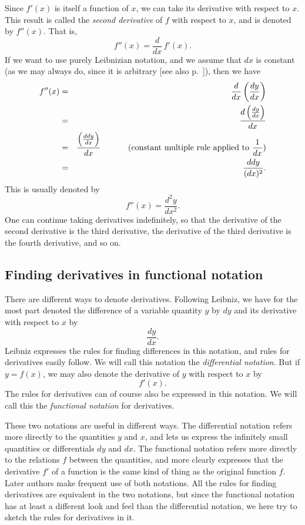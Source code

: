 \documentclass[twoside,openright]{article}
\begin{document}
Since $f'(x)$ is itself a function of $x$, we can take its derivative
with respect to $x$.  This result is called the {\em second
  derivative} of $f$ with respect to $x$, and is denoted by $f''(x).$
That is,
$$f''(x) =  \frac{d}{dx}\,f'(x).$$
If we want to use purely Leibnizian notation, and we assume that $dx$
is constant (as we may always do, since it is arbitrary [see also p.\
\pageref{dx_constant}]), then we have
\begin{eqnarray*}
  f''(x) & = & \frac{d}{dx}\left(\frac{dy}{dx}\right)\\
         & = & \frac{d\left(\frac{dy}{dx}\right)}{dx}\\
         & = & \frac{\left(\frac{ddy}{dx}\right)}{dx}\mbox{\hspace{3em} (constant multiple rule applied to } \frac{1}{dx})\\
         & = & \frac{ddy}{(dx)^2}.
\end{eqnarray*}
This is usually denoted by
$$f''(x) = \frac{d^2y}{dx^2}.$$
One can continue taking derivatives indefinitely, so that the
derivative of the second derivative is the third derivative, the
derivative of the third derivative is the fourth derivative, and so
on.

\subsection*{Finding derivatives in functional notation}

There are different ways to denote derivatives.  Following Leibniz, we
have for the most part denoted the difference of a variable quantity
$y$ by $dy$ and its derivative with respect to $x$ by
$$\frac{dy}{dx}.$$
Leibniz expresses the rules for finding differences in this notation,
and rules for derivatives easily follow.  We will call this notation
the {\em differential notation}.  But if $y =f(x)$, we may also
denote the derivative of $y$ with respect to $x$ by
$$f'(x).$$
The rules for derivatives can of course also be expressed in this
notation.  We will call this the {\em functional notation} for
derivatives.

These two notations are useful in different ways.  The differential
notation refers more directly to the quantities $y$ and $x$, and lets
us express the infinitely small quantities or differentials $dy$ and
$dx$.  The functional notation refers more directly to the relations
$f$ between the quantities, and more clearly expresses that the
derivative $f'$ of a function is the same kind of thing as the
original function $f.$ Later authors make frequent use of both
notations.  All the rules for finding derivatives are equivalent in
the two notations, but since the functional notation has at least a
different look and feel than the differential notation, we here try to
sketch the rules for derivatives in it.
\end{document}
